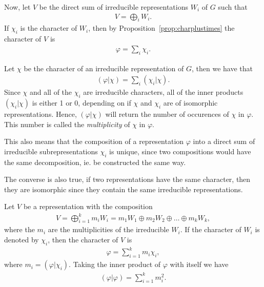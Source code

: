 Now, let $V$ be the direct sum of irreducible representations $W_i$ of $G$ such that
\begin{align*}
	V = \bigoplus_i W_i.
\end{align*}
If $\chi_i$ is the character of $W_i$, then by Proposition~\ref{prop:charplustimes} the character of $V$ is
\begin{align*}
	\varphi = \sum_i \chi_i.
\end{align*}

Let $\chi$ be the character of an irreducible representation of $G$, then we have that
\begin{align*}
	(\varphi|\chi) = \sum_i (\chi_i|\chi).
\end{align*}
Since $\chi$ and all of the $\chi_i$ are irreducible characters, all of the inner products $(\chi_i|\chi)$ is either 1 or 0, depending on if $\chi$ and $\chi_i$ are of isomorphic representations. Hence, $(\varphi|\chi)$ will return the number of occurences of $\chi$ in $\varphi$. This number is called the \textit{multiplicity} of $\chi$ in $\varphi$.

\begin{remark}
	This also means that the composition of a representation $\varphi$ into a direct sum of irreducible subrepresentations $\chi_i$ is unique, since two compositions would have the same decomposition, ie. be constructed the same way.
\end{remark}

\begin{remark}
	The converse is also true, if two representations have the same character, then they are isomorphic since they contain the same irreducible representations.
\end{remark}

\begin{note}
	Let $V$ be a representation with the composition 
	\begin{align*}
		V = \bigoplus_{i=1}^k m_i W_i = m_1W_1 \oplus m_2W_2 \oplus \dots \oplus m_k W_k,
	\end{align*}
	where the $m_i$ are the multiplicities of the irreducible $W_i$. If the character of $W_i$ is denoted by $\chi_i$, then the character of $V$ is
	\begin{align*}
		\varphi = \sum_{i=1}^k m_i \chi_i,
	\end{align*}
	where $m_i = (\varphi|\chi_i)$.	Taking the inner product of $\varphi$ with itself we have
	\begin{align}\label{eq:innerprodself}
		(\varphi|\varphi) = \sum_{i=1}^k m_i^2.
	\end{align}
\end{note}


